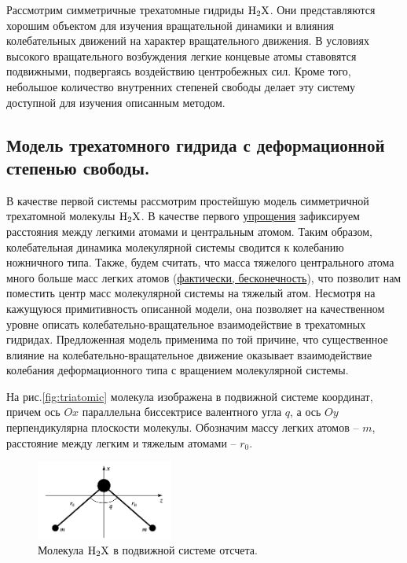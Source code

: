 Рассмотрим симметричные трехатомные гидриды $\ce{H2X}$. Они представляются хорошим объектом для изучения вращательной динамики и влияния колебательных движений на характер вращательного движения. В условиях высокого вращательного возбуждения легкие концевые атомы ставовятся подвижными, подвергаясь воздействию центробежных сил. Кроме того, небольшое количество внутренних степеней свободы делает эту систему доступной для изучения описанным методом. 

\subsection{Модель трехатомного гидрида с деформационной степенью свободы.}

В качестве первой системы рассмотрим простейшую модель симметричной трехатомной молекулы $\ce{H2X}$. В качестве первого \underline{упрощения} зафиксируем расстояния между легкими атомами и центральным атомом. Таким образом, колебательная динамика молекулярной системы сводится к колебанию ножничного типа. Также, будем считать, что масса тяжелого центрального атома много больше масс легких атомов (\underline{фактически, бесконечность}), что позволит нам поместить центр масс молекулярной системы на тяжелый атом. Несмотря на кажущуюся примитивность описанной модели, она позволяет на качественном уровне описать колебательно-вращательное взаимодействие в трехатомных гидридах. Предложенная модель применима по той причине, что существенное влияние на колебательно-вращательное движение оказывает взаимодействие колебания деформационного типа с вращением молекулярной системы.

На рис.\eqref{fig:triatomic} молекула изображена в подвижной системе координат, причем ось $Ox$ параллельна биссектрисе валентного угла $q$, а ось $Oy$ перпендикулярна плоскости молекулы. Обозначим массу легких атомов -- $m$, расстояние между легким и тяжелым атомами -- $r_0$. 

\begin{figure}[!ht]
  \centering
	\includegraphics[width=0.4\textwidth]{../pictures/triatomic_fixed.png}
	\caption{Молекула $\ce{H2X}$ в подвижной системе отсчета.}
	\label{fig:triatomic}
\end{figure}

